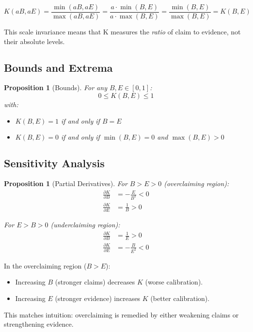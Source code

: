 \documentclass[11pt,a4paper]{article}
\newtheorem{proposition}[theorem]{Proposition}
\theoremstyle{remark}
\begin{document}
\begin{proofbox}
\begin{equation}
K(aB, aE) = \frac{\min(aB, aE)}{\max(aB, aE)} = \frac{a \cdot \min(B, E)}{a \cdot \max(B, E)} = \frac{\min(B, E)}{\max(B, E)} = K(B, E)
\end{equation}
\end{proofbox}

This scale invariance means that K measures the \textit{ratio} of claim to evidence, not their absolute levels.

\subsection{Bounds and Extrema}

\begin{proposition}[Bounds]
\label{prop:bounds}
For any $B, E \in [0, 1]$:
\begin{equation}
0 \leq K(B, E) \leq 1
\end{equation}
with:
\begin{itemize}
    \item $K(B, E) = 1$ if and only if $B = E$
    \item $K(B, E) = 0$ if and only if $\min(B, E) = 0$ and $\max(B, E) > 0$
\end{itemize}
\end{proposition}

\subsection{Sensitivity Analysis}

\begin{proposition}[Partial Derivatives]
\label{prop:derivatives}
For $B > E > 0$ (overclaiming region):
\begin{align}
\frac{\partial K}{\partial B} &= -\frac{E}{B^2} < 0 \\
\frac{\partial K}{\partial E} &= \frac{1}{B} > 0
\end{align}

For $E > B > 0$ (underclaiming region):
\begin{align}
\frac{\partial K}{\partial B} &= \frac{1}{E} > 0 \\
\frac{\partial K}{\partial E} &= -\frac{B}{E^2} < 0
\end{align}
\end{proposition}

\begin{keyinsight}[title={Interpretation of Partial Derivatives}]
In the overclaiming region ($B > E$):
\begin{itemize}
    \item Increasing $B$ (stronger claims) decreases $K$ (worse calibration).
    \item Increasing $E$ (stronger evidence) increases $K$ (better calibration).
\end{itemize}
This matches intuition: overclaiming is remedied by either weakening claims or strengthening evidence.
\end{keyinsight}
\end{document}
